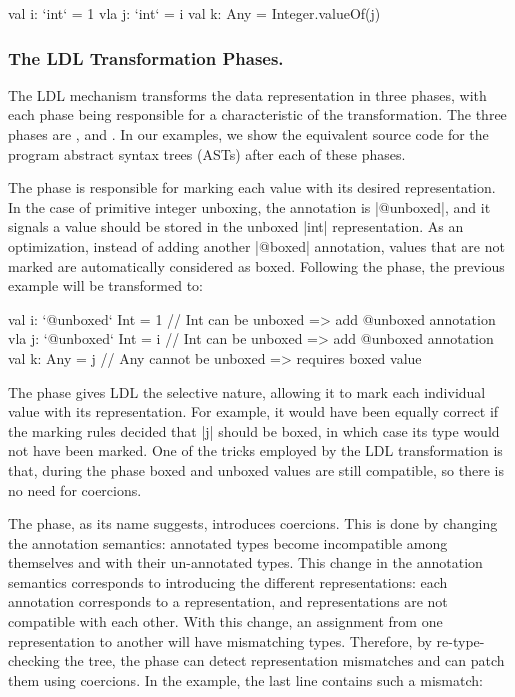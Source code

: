 \begin{lstlisting-nobreak}
val i: `int` = 1
vla j: `int` = i
val k: Any = Integer.valueOf(j)
\end{lstlisting-nobreak}

\subsubsection{The LDL Transformation Phases.}

The LDL mechanism transforms the data representation in three phases, with each phase being responsible for a characteristic of the transformation. The three phases are \inject{}, \coerce{} and \commit{}. In our examples, we show the equivalent source code for the program abstract syntax trees (ASTs) after each of these phases.

The \inject{} phase is responsible for marking each value with its desired representation. In the case of primitive integer unboxing, the annotation is |@unboxed|, and it signals a value should be stored in the unboxed |int| representation. As an optimization, instead of adding another |@boxed| annotation, values that are not marked are automatically considered as boxed. Following the \inject{} phase, the previous example will be transformed to:

\begin{lstlisting-nobreak}
val i: `@unboxed` Int = 1 // Int can be unboxed => add @unboxed annotation
vla j: `@unboxed` Int = i // Int can be unboxed => add @unboxed annotation
val k: Any = j                  // Any cannot be unboxed => requires boxed value
\end{lstlisting-nobreak}

The \inject{} phase gives LDL the selective nature, allowing it to mark each individual value with its representation. For example, it would have been equally correct if the marking rules decided that |j| should be boxed, in which case its type would not have been marked. One of the tricks employed by the LDL transformation is that, during the \inject{} phase boxed and unboxed values are still compatible, so there is no need for coercions.

The \coerce{} phase, as its name suggests, introduces coercions. This is done by changing the annotation semantics: annotated types become incompatible among themselves and with their un-annotated types. This change in the annotation semantics corresponds to introducing the different representations: each annotation corresponds to a representation, and representations are not compatible with each other. With this change, an assignment from one representation to another will have mismatching types. Therefore, by re-type-checking the tree, the \coerce{} phase can detect representation mismatches and can patch them using coercions. In the example, the last line contains such a mismatch:

